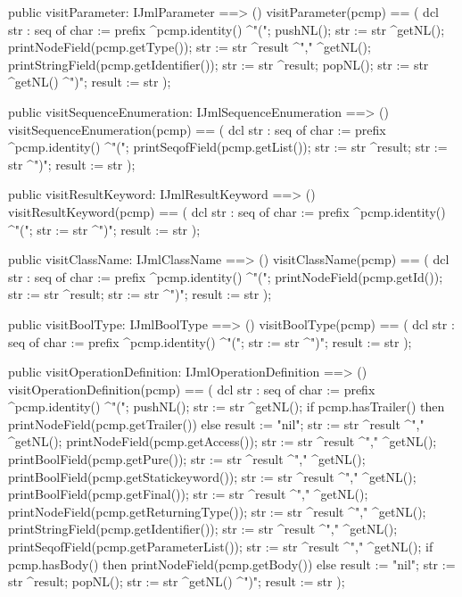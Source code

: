 \begin{vdm_al}
  public visitParameter: IJmlParameter ==> ()
  visitParameter(pcmp) ==
    ( dcl str : seq of char := prefix ^pcmp.identity() ^"(";
      pushNL();
      str := str ^getNL();
      printNodeField(pcmp.getType());
      str := str ^result ^"," ^getNL();
      printStringField(pcmp.getIdentifier());
      str := str ^result;
      popNL();
      str := str ^getNL() ^")";
      result := str );

  public visitSequenceEnumeration: IJmlSequenceEnumeration ==> ()
  visitSequenceEnumeration(pcmp) ==
    ( dcl str : seq of char := prefix ^pcmp.identity() ^"(";
      printSeqofField(pcmp.getList());
      str := str ^result;
      str := str ^")";
      result := str );

  public visitResultKeyword: IJmlResultKeyword ==> ()
  visitResultKeyword(pcmp) ==
    ( dcl str : seq of char := prefix ^pcmp.identity() ^"(";
      str := str ^")";
      result := str );

  public visitClassName: IJmlClassName ==> ()
  visitClassName(pcmp) ==
    ( dcl str : seq of char := prefix ^pcmp.identity() ^"(";
      printNodeField(pcmp.getId());
      str := str ^result;
      str := str ^")";
      result := str );

  public visitBoolType: IJmlBoolType ==> ()
  visitBoolType(pcmp) ==
    ( dcl str : seq of char := prefix ^pcmp.identity() ^"(";
      str := str ^")";
      result := str );

  public visitOperationDefinition: IJmlOperationDefinition ==> ()
  visitOperationDefinition(pcmp) ==
    ( dcl str : seq of char := prefix ^pcmp.identity() ^"(";
      pushNL();
      str := str ^getNL();
      if pcmp.hasTrailer()
      then printNodeField(pcmp.getTrailer())
      else result := "nil";
      str := str ^result ^"," ^getNL();
      printNodeField(pcmp.getAccess());
      str := str ^result ^"," ^getNL();
      printBoolField(pcmp.getPure());
      str := str ^result ^"," ^getNL();
      printBoolField(pcmp.getStatickeyword());
      str := str ^result ^"," ^getNL();
      printBoolField(pcmp.getFinal());
      str := str ^result ^"," ^getNL();
      printNodeField(pcmp.getReturningType());
      str := str ^result ^"," ^getNL();
      printStringField(pcmp.getIdentifier());
      str := str ^result ^"," ^getNL();
      printSeqofField(pcmp.getParameterList());
      str := str ^result ^"," ^getNL();
      if pcmp.hasBody()
      then printNodeField(pcmp.getBody())
      else result := "nil";
      str := str ^result;
      popNL();
      str := str ^getNL() ^")";
      result := str );


\end{vdm_al}
